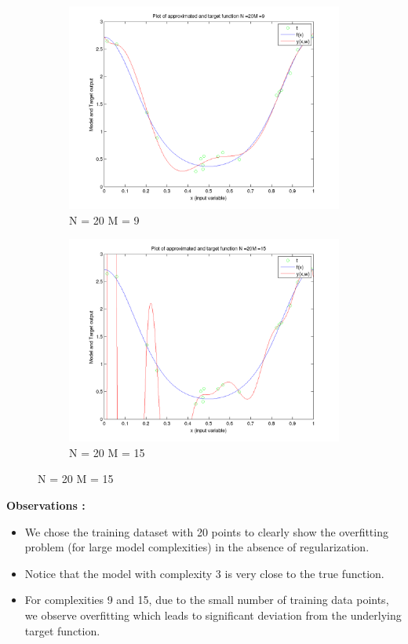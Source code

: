 \documentclass{article}
\begin{document}
\begin{figure}[H]
\begin{subfigure}{.5\textwidth}
\centering
\includegraphics[width=\linewidth]{VaryingM_N20M9}
\caption{N = 20 M = 9}
\end{subfigure}
\begin{subfigure}{.5\textwidth}
\includegraphics[width=\linewidth]{VaryingM_N20M15}
\caption{N = 20 M = 15}
\end{subfigure}



\end{figure}
\textbf{Observations :}

\begin{itemize}
\item We chose the training dataset with 20 points to clearly show the overfitting problem (for large model complexities) in the absence of regularization. 
\item Notice that the model with complexity 3 is very close to the true function.
\item For complexities 9 and 15, due to the small number of training data points, we observe overfitting which leads to significant deviation from the underlying target function.

\end{itemize}
\newpage
\end{document}
